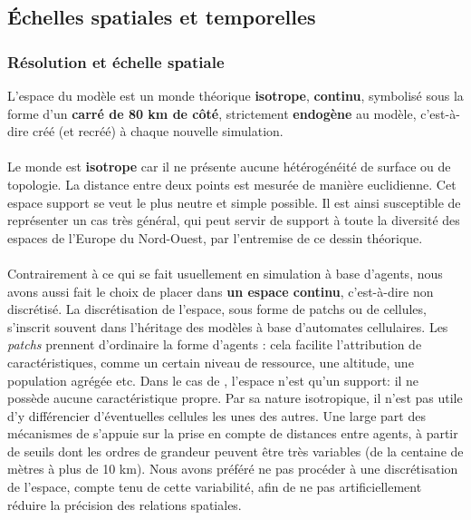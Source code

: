 
\clearpage
\subsection{Échelles spatiales et temporelles}

\subsubsection{Résolution et échelle spatiale \label{subsec:reso-spatiale}}

L'espace du modèle est un monde théorique \textbf{isotrope}, \textbf{continu}, symbolisé sous la forme d'un \textbf{carré de 80 km de côté}, strictement \textbf{endogène} au modèle, c'est-à-dire créé (et recréé) à chaque nouvelle simulation.

\paragraph[Isotrope]{} Le monde est \textbf{isotrope} car il ne présente aucune hétérogénéité de surface ou de topologie.
La distance entre deux points est mesurée de manière euclidienne.
Cet espace support se veut le plus neutre et simple possible.
Il est ainsi susceptible de représenter un cas très général, qui peut servir de support à toute la diversité des espaces de l'Europe du Nord-Ouest, par l'entremise de ce dessin théorique.

\paragraph[Continu]{}Contrairement à ce qui se fait usuellement en simulation à base d'agents, nous avons aussi fait le choix de placer \simfeodal{} dans \textbf{un espace continu}, c'est-à-dire non discrétisé.
La discrétisation de l'espace, sous forme de \og patchs\fg{} ou de \og cellules\fg{}, s'inscrit souvent dans l'héritage des modèles à base d'automates cellulaires.
Les \textit{patchs} prennent d'ordinaire la forme d'agents : cela facilite l'attribution de caractéristiques, comme un certain niveau de ressource, une altitude, une population agrégée etc.
Dans le cas de \simfeodal{}, l'espace n'est qu'un support: il ne possède aucune caractéristique propre.
Par sa nature isotropique, il n'est pas utile d'y différencier d'éventuelles cellules les unes des autres.
Une large part des mécanismes de \simfeodal{} s'appuie sur la prise en compte de distances entre agents, à partir de seuils dont les ordres de grandeur peuvent être très variables (de la centaine de mètres à plus de 10 km).
Nous avons préféré ne pas procéder à une discrétisation de l'espace, compte tenu de cette variabilité, afin de ne pas artificiellement réduire la précision des relations spatiales.


